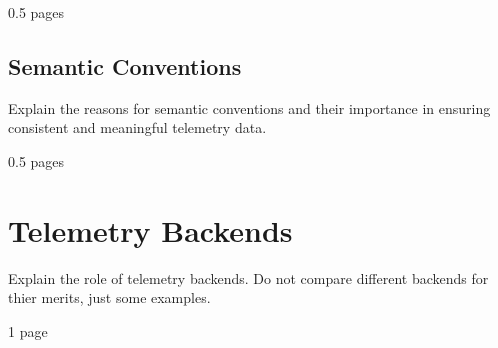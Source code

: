 0.5 pages

\subsection{Semantic Conventions}

Explain the reasons for semantic conventions and their importance in ensuring consistent and meaningful telemetry data.

0.5 pages

\section{Telemetry Backends}
\label{sec:o_telemetry_backends}

Explain the role of telemetry backends. Do not compare different backends for thier merits, just some examples.

1 page
